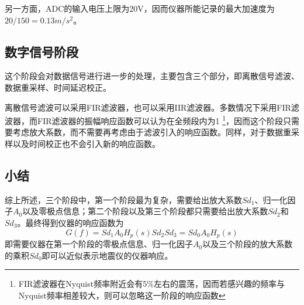另一方面，ADC的输入电压上限为20V，因而仪器所能记录的最大加速度为$20/150=0.13 m/s^2$。

\subsection{数字信号阶段}
这个阶段会对数据信号进行进一步的处理，主要包含三个部分，即离散信号滤波、数据重采样、时间延迟校正。

离散信号滤波可以采用FIR滤波器，也可以采用IIR滤波器。多数情况下采用FIR滤波器，而FIR滤波器的振幅响应函数可以认为在全频段内为1
\footnote{FIR滤波器在Nyquist频率附近会有5\%左右的震荡，因而若感兴趣的频率与Nyquist频率相差较大，则可以忽略这一阶段的响应函数}，因而这个阶段只需要考虑放大系数，而不需要再考虑由于滤波引入的响应函数。同样，对于数据重采样以及时间校正也不会引入新的响应函数。

\subsection{小结}
综上所述，三个阶段中，第一个阶段最为复杂，需要给出放大系数$Sd_{1}$、归一化因子$A_0$以及零极点信息；第二个阶段以及第三个阶段都只需要给出放大系数$Sd_{2}$和$Sd_3$。最终得到仪器的响应函数为
\[
    G(f)=Sd_1 A_0 H_p(s) Sd_2 Sd_3=Sd_0 A_0 H_p(s)
\]
即需要仪器在第一个阶段的零极点信息、归一化因子$A_0$以及三个阶段的放大系数的乘积$Sd_0$即可以近似表示地震仪的仪器响应。

